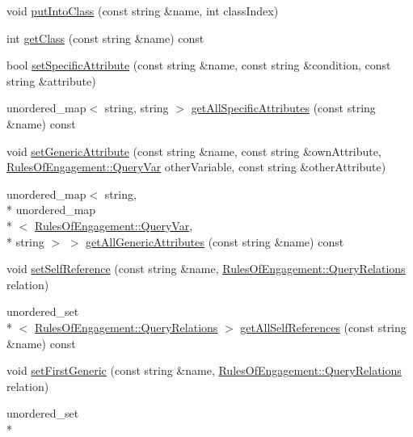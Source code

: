 \begin{DoxyCompactItemize}
\item 
void \hyperlink{class_synonym_table_a2f84ea7622341e430ccef2fe54cd0493}{put\-Into\-Class} (const string \&name, int class\-Index)
\item 
int \hyperlink{class_synonym_table_ae9aefbf36f2f08661aff39d903f4d4e9}{get\-Class} (const string \&name) const 
\item 
bool \hyperlink{class_synonym_table_aedd5d18cb3c7f31827142e52b76f725a}{set\-Specific\-Attribute} (const string \&name, const string \&condition, const string \&attribute)
\item 
unordered\-\_\-map$<$ string, string $>$ \hyperlink{class_synonym_table_aae3ea3b80a7c9d8527299bb709da36e7}{get\-All\-Specific\-Attributes} (const string \&name) const 
\item 
void \hyperlink{class_synonym_table_aa3939003680ee31c93b61adb82e5e407}{set\-Generic\-Attribute} (const string \&name, const string \&own\-Attribute, \hyperlink{class_rules_of_engagement_a5dd2b28fd0c906d9b08e29e371713ead}{Rules\-Of\-Engagement\-::\-Query\-Var} other\-Variable, const string \&other\-Attribute)
\item 
unordered\-\_\-map$<$ string, \\*
unordered\-\_\-map\\*
$<$ \hyperlink{class_rules_of_engagement_a5dd2b28fd0c906d9b08e29e371713ead}{Rules\-Of\-Engagement\-::\-Query\-Var}, \\*
string $>$ $>$ \hyperlink{class_synonym_table_a24fafd4eef36373854f0552639d1a23a}{get\-All\-Generic\-Attributes} (const string \&name) const 
\item 
void \hyperlink{class_synonym_table_a394f3fe82c0e8908e531fed0353a043b}{set\-Self\-Reference} (const string \&name, \hyperlink{class_rules_of_engagement_a5e08db2a0638b98dbb06ad923a33d817}{Rules\-Of\-Engagement\-::\-Query\-Relations} relation)
\item 
unordered\-\_\-set\\*
$<$ \hyperlink{class_rules_of_engagement_a5e08db2a0638b98dbb06ad923a33d817}{Rules\-Of\-Engagement\-::\-Query\-Relations} $>$ \hyperlink{class_synonym_table_a644d28f9dc3c765572a83c98cf75b66d}{get\-All\-Self\-References} (const string \&name) const 
\item 
void \hyperlink{class_synonym_table_ad53932d85419c69ff93db7a0b094791b}{set\-First\-Generic} (const string \&name, \hyperlink{class_rules_of_engagement_a5e08db2a0638b98dbb06ad923a33d817}{Rules\-Of\-Engagement\-::\-Query\-Relations} relation)
\item 
unordered\-\_\-set\\*

\end{DoxyCompactItemize}
